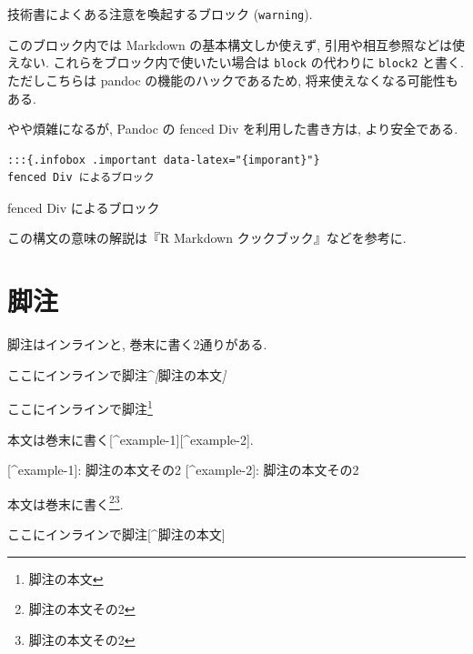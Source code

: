 \documentclass[
]{bxjsbook}
\newenvironment{Shaded}{\begin{snugshade}}{\end{snugshade}}
\newcommand{\CommentTok}[1]{\textcolor[rgb]{0.56,0.35,0.01}{\textit{#1}}}
\newcommand{\NormalTok}[1]{#1}
\newcommand{\OtherTok}[1]{\textcolor[rgb]{0.56,0.35,0.01}{#1}}
\newenvironment{infobox}[1]{\begin{itemize}\renewcommand{\labelitemi}{\raisebox{-.7\height}[0pt][0pt]{%
  {\setkeys{Gin}{width=3em,keepaspectratio}\texttt{[image: \_latex/\_img/\#1]}}}}
  \setlength{\fboxsep}{1em}
  \begin{greyblock}
  \item
  }{\end{greyblock}\end{itemize}
}
\newenvironment{warning}{\begin{infobox}{warning}}{\end{infobox}}
\theoremstyle{definition}
\theoremstyle{definition}
\theoremstyle{definition}
\theoremstyle{remark}
\begin{document}
\begin{warning}
技術書によくある注意を喚起するブロック (\texttt{warning}).
\end{warning}

このブロック内では Markdown の基本構文しか使えず,
引用や相互参照などは使えない. これらをブロック内で使いたい場合は
\texttt{block} の代わりに \texttt{block2} と書く. ただしこちらは pandoc
の機能のハックであるため, 将来使えなくなる可能性もある.

やや煩雑になるが, Pandoc の fenced Div を利用した書き方は,
より安全である.

\begin{verbatim}
:::{.infobox .important data-latex="{imporant}"}
fenced Div によるブロック
\end{verbatim}

\begin{infobox}{important}
fenced Div によるブロック

\end{infobox}

この構文の意味の解説は『R Markdown クックブック』などを参考に.

\hypertarget{ux811aux6ce8}{%
\section{脚注}\label{ux811aux6ce8}}

脚注はインラインと, 巻末に書く2通りがある.

\begin{Shaded}
\begin{Highlighting}[]
\NormalTok{ここにインラインで脚注\^{}}\CommentTok{[}\OtherTok{脚注の本文}\CommentTok{]}
\end{Highlighting}
\end{Shaded}

ここにインラインで脚注\footnote{脚注の本文}

\begin{Shaded}
\begin{Highlighting}[]
\NormalTok{本文は巻末に書く}\OtherTok{[\^{}example{-}1][\^{}example{-}2]}\NormalTok{.}

\OtherTok{[\^{}example{-}1]: }\NormalTok{脚注の本文その2}
\OtherTok{[\^{}example{-}2]: }\NormalTok{脚注の本文その2}
\end{Highlighting}
\end{Shaded}

本文は巻末に書く\footnote{脚注の本文その2}\footnote{脚注の本文その2}.

ここにインラインで脚注{[}\^{}脚注の本文{]}
\end{document}
